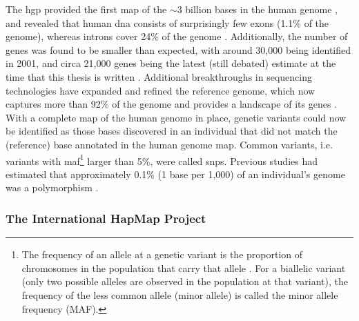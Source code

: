 The \gls{hgp} provided the first map of the $\sim$3 billion bases in the human genome \cite{lander2001initial, schmutz2004quality, hattori2005finishing}, and revealed that human \gls{dna} consists of surprisingly few exons (1.1\% of the genome), whereas introns cover 24\% of the genome \cite{venter2001sequence, lander2001initial}. 
Additionally, the number of genes was found to be smaller than expected, with around 30,000 being identified in 2001, and circa 21,000 genes being the latest (still debated) estimate at the time that this thesis is written \cite{pertea2018thousands}. 
Additional breakthroughs in sequencing technologies have expanded and refined the reference genome, which now captures more than 92\% of the genome and provides a landscape of its 
genes \cite{lander2011initial}.\\

With a complete map of the human genome in place, genetic variants could now be identified as those bases discovered in an individual that did not match the (reference) base annotated in the human genome map. 
Common variants, i.e. variants with \gls{maf}\footnote{The frequency of an
allele at a genetic variant is the proportion of chromosomes in the population that
carry that allele \cite{laird2010fundamentals}. 
For a biallelic variant (only two possible alleles are observed in the population at that variant), the frequency of the less common allele (minor allele) is called the minor allele frequency (MAF).} larger than 5\%, were called \glspl{snp}. 
Previous studies had estimated that approximately 0.1\% (1 base per 1,000) of an individual's genome was a polymorphism \cite{wang1998large, li1991low, cargill1999characterization}. 

\subsubsection{The International HapMap Project}

